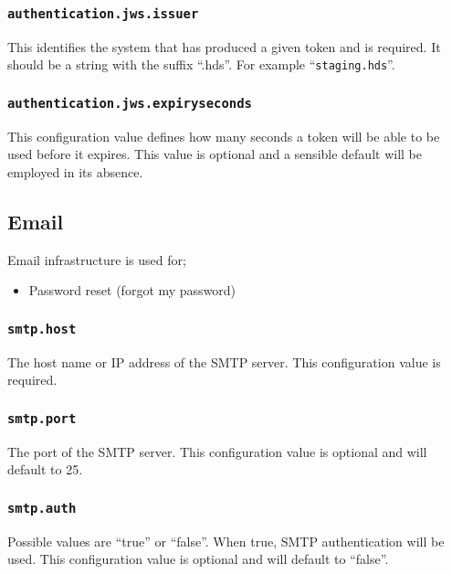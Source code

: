\subsubsection{\tt authentication.jws.issuer}

This identifies the system that has produced a given token and is required.  It should be a string with the suffix ``.hds''.  For example ``{\tt staging.hds}''.

\subsubsection{\tt authentication.jws.expiryseconds}

This configuration value defines how many seconds a token will be able to be used before it expires.  This value is optional and a sensible default will be employed in its absence.

\subsection{Email}

Email infrastructure is used for;

\begin{itemize}
\item Password reset (forgot my password)
\end{itemize}

\subsubsection{\tt smtp.host}

The host name or IP address of the SMTP server.  This configuration value is required.

\subsubsection{\tt smtp.port}

The port of the SMTP server.  This configuration value is optional and will default to 25.

\subsubsection{\tt smtp.auth}

Possible values are ``true'' or ``false''.  When true, SMTP authentication will be used.  This configuration value is optional and will default to ``false''.

